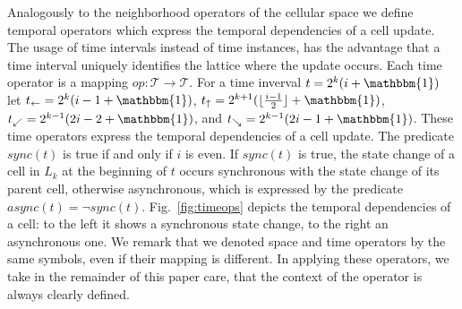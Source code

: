 \documentclass[pre,amssymb,showpacs,showkeys,preprint]{revtex4}
\begin{document}
Analogously to the neighborhood operators of the cellular space we define temporal operators which express
the temporal dependencies of a cell update.
The usage of time intervals instead of time instances, has the advantage
that a time interval uniquely identifies the lattice where the update occurs.
Each time operator is a mapping $\mathit{op}: \mathcal{T} \rightarrow \mathcal{T}$.
For a time inverval $t = 2^k (i + \mathbbm{1})$ let
$t_\leftarrow = 2^k (i - 1 + \mathbbm{1})$,
$t_\uparrow = 2^{k + 1} (\lfloor \frac{i-1}{2} \rfloor + \mathbbm{1})$,
$t_\swarrow = 2^{k-1} (2i - 2  + \mathbbm{1})$, and
$t_\searrow =  2^{k-1} (2i - 1 + \mathbbm{1})$.
These time operators express the temporal dependencies of a cell update.
The predicate $\mathit{sync}(t)$ is true if and only if $i$ is even.
If $\mathit{sync}(t)$ is true, the state change of a cell in $L_k$ at the beginning of $t$ occurs
synchronous with the state change of its parent cell, otherwise asynchronous,
which is expressed by the predicate $\mathit{async}(t) = \neg \mathit{sync}(t)$.
Fig.~\ref{fig:timeops} depicts the temporal dependencies of a cell: to the left it shows a
synchronous state change, to the right an asynchronous one.
We remark that we denoted space and time operators by the same symbols, even if their mapping is different.
In applying these operators, we take in the remainder of this paper care, that the context of the operator is always clearly defined.
\end{document}
